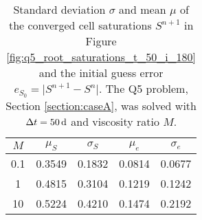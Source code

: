 \begin{table}%
\caption{Standard deviation $\sigma$ and mean $\mu$ of the converged cell saturations $S^{n+1}$ in Figure \ref{fig:q5_root_saturations_t_50_i_180} and the initial guess error $e_{S_0} = \lvert S^{n+1} - S^n \rvert$. The Q5 problem, Section \ref{section:caseA}, was solved with $\Delta t = \unit[50]{d}$ and viscosity ratio $M$.}%
\label{table:q5_saturations_statisitcs_t_50_i_180}%
\centering%
\begin{tabular}{ ccc cc }%
\hline
$M$ & $\mu_{S}$ & $\sigma_{S}$ & $\mu_{e}$ & $\sigma_{e}$ \\
\hline
0.1 & 0.3549 & 0.1832 & 0.0814 & 0.0677 \\
1 & 0.4815 & 0.3104 & 0.1219 & 0.1242 \\
10 & 0.5224 & 0.4210 & 0.1474 & 0.2192 \\
\hline
\end{tabular}%
\end{table}%